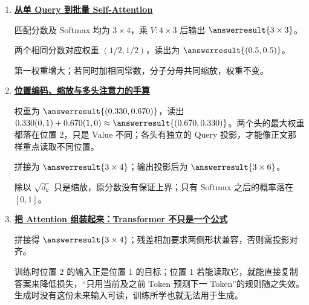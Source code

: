 \begin{enumerate}[leftmargin=5.4em,labelsep=.7em,itemsep=9pt]
\par{}
\item[\textbf{第 15 章}] \label{answer:11-softmax-memory}\textbf{\hyperref[check:11-softmax-memory]{从单 Query 到批量 Self-Attention}}\par\nobreak
{}匹配分数及 Softmax 均为 $3\times4$，乘 $V:4\times3$ 后输出 $\answerresult{3\times3}$。
\par{}两个相同分数对应权重 $(1/2,1/2)$，读出为 $\answerresult{(0.5,0.5)}$。
\par{}第一权重增大；若同时加相同常数，分子分母共同缩放，权重不变。
\par{}
\item[\textbf{第 16 章}] \label{answer:22a-position-multihead}\textbf{\hyperref[check:22a-position-multihead]{位置编码、缩放与多头注意力的手算}}\par\nobreak
{}权重为 $\answerresult{(0.330,0.670)}$，读出 $0.330(0,1)+0.670(1,0)\approx\answerresult{(0.670,0.330)}$。两个头的最大权重都落在位置 2，只是 Value 不同；各头有独立的 Query 投影，才能像正文那样重点读取不同位置。
\par{}拼接为 $\answerresult{3\times4}$；输出投影后为 $\answerresult{3\times6}$。
\par{}除以 $\sqrt{d_k}$ 只是缩放，原分数没有保证上界；只有 Softmax 之后的概率落在 $[0,1]$。
\par{}
\item[\textbf{第 17 章}] \label{answer:22-transformer-architecture}\textbf{\hyperref[check:22-transformer-architecture]{把 Attention 组装起来：Transformer 不只是一个公式}}\par\nobreak
{}拼接得 $\answerresult{3\times4}$；残差相加要求两侧形状兼容，否则需投影对齐。
\par{}训练时位置 $2$ 的输入正是位置 $1$ 的目标；位置 $1$ 若能读取它，就能直接复制答案来降低损失，“只用当前及之前 Token 预测下一 Token”的规则随之失效。生成时没有这份未来输入可读，训练所学也就无法用于生成。

\end{enumerate}
